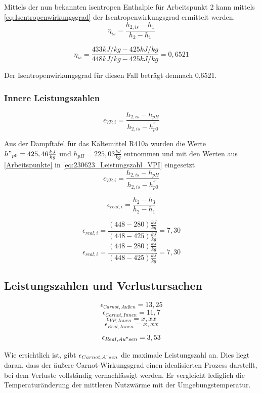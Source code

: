     Mittels der nun bekannten isentropen Enthalpie für Arbeitspunkt 2 kann mittels \autoref{eq:Isentropenwirkungsgrad} der Isentropenwirkungsgrad ermittelt werden.
\begin{equation}
    \eta_{is}=\frac{h_{2,is}-h_{1}}{h_{2}-h_{1}}
    \label{eq:Isentropenwirkungsgrad}
\end{equation}

$$\eta_{is}=\frac{433 kJ/kg-425 kJ/kg}{448 kJ/kg-425 kJ/kg}=0,6521$$

Der Isentropenwirkungsgrad für diesen Fall beträgt demnach 0,6521.\\


\subsubsection*{Innere Leistungszahlen}

\begin{equation}
   \epsilon_{VP,i} = \frac{h_{2,is}-h_{pH}}{h_{2,is}-h^{''}_{p0}}
\label{eq:230623_Leistungszahl_VPI}
\end{equation}

Aus der Dampftafel für das Kältemittel R410a wurden die Werte $h"_{p0}=425,46 \frac{kJ}{kg}$ und $h_{pH}= 225,03 \frac{kJ}{kg}$ entnommen und mit den Werten aus \autoref*{Arbeitspunkte} in \autoref{eq:230623_Leistungszahl_VPI} eingesetzt
$$\epsilon_{VP,i} = \frac{h_{2,is}-h_{pH}}{h_{2,is}-h^{''}_{p0}}$$

\begin{equation}
    \epsilon_{real,i}= \frac{h_2-h_3}{h_2-h_1}
\end{equation}

$$\epsilon_{real,i}= \frac{(448-280)\frac{kJ}{kg}}{(448-425)\frac{kJ}{kg}} = 7,30 $$
$$\epsilon_{real,i}= \frac{(448-280)\frac{kJ}{kg}}{(448-425)\frac{kJ}{kg}} = 7,30 $$

\subsection{Leistungszahlen und Verlustursachen}


$$\epsilon_{Carnot,Außen} = 13,25$$
$$\epsilon_{Carnot,Innen} = 11,7$$
$$\epsilon_{VP,Innen} = x,xx$$
$$\epsilon_{Real,Innen} = x,xx$$
$$\epsilon_{Real,Au"sen} = 3,53$$

Wie ersichtlich ist, gibt $\epsilon_{Carnot,A"sen}$ die maximale Leistungszahl an. 
Dies liegt daran, dass der äußere Carnot-Wirkungsgrad einen idealisierten Prozess darstellt, bei dem Verluste vollständig vernachlässigt werden. 
Er vergleicht lediglich die Temperaturänderung der mittleren Nutzwärme mit der Umgebungstemperatur.

